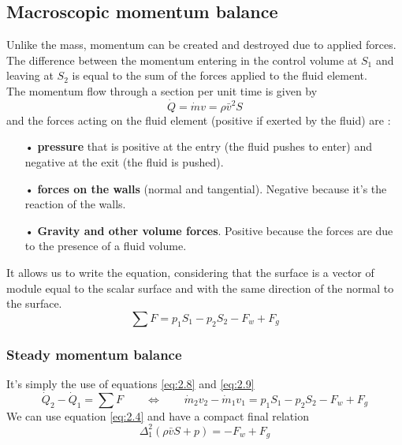 	\subsection{Macroscopic momentum balance}
		Unlike the mass, momentum can be created and destroyed due to applied forces. The difference between the momentum entering in the control volume at $S_1$ and leaving at $S_2$ is equal to the sum of the forces applied to the fluid element. \\
		The momentum flow through a section per unit time is given by 
		\begin{equation}
			\dot{Q} = \dot{m}v = \rho \bar{v}^2 S
			\label{eq:2.8}
		\end{equation}
			and the forces acting on the fluid element (positive if exerted by the fluid) are :
			
		\begin{itemize}
				\item[•] \textbf{pressure} that is positive at the entry (the fluid pushes to enter) and negative at the exit (the fluid is pushed).
				\item[•] \textbf{forces on the walls} (normal and tangential). Negative because it's the reaction of the walls.
				\item[•] \textbf{Gravity and other volume forces}. Positive because the forces are due to the presence of a fluid volume. \\
		\end{itemize}

		It allows us to write the equation, considering that the surface is a vector of module equal to the scalar surface and with the same direction of the normal to the surface. 
		\begin{equation}
			\sum F = p_1S_1 - p_2S_2 - F_w + F_g
			\label{eq:2.9}
		\end{equation}
		
		\subsubsection{Steady momentum balance}
			It's simply the use of equations \autoref{eq:2.8} and \autoref{eq:2.9}			
			\begin{equation}
				\dot{Q}_2 - \dot{Q}_1 = \sum F \qquad \Leftrightarrow \qquad \dot{m}_2v_2 - \dot{m}_1v_1 = p_1S_1 -p_2S_2 - F_w + F_g
			\end{equation}
			We can use equation \autoref{eq:2.4} and have a compact final relation 
			\begin{equation}
				\Delta ^2 _1 (\rho \bar{v}S + p) = -F_w+F_g
			\end{equation}
			
